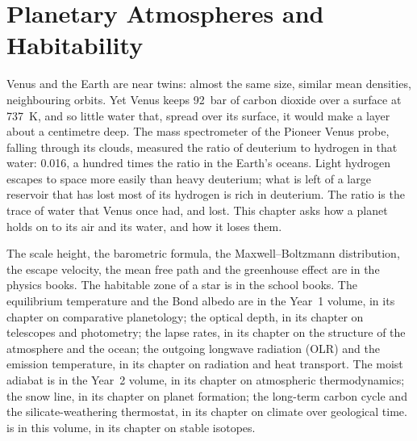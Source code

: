 \chapter{Planetary Atmospheres and Habitability}\label{ch:b3:planetary-atmospheres}

Venus and the Earth are near twins: almost the same size, similar mean
densities, neighbouring orbits. Yet Venus keeps \qty{92}{bar} of carbon
dioxide over a surface at \qty{737}{K}, and so little water that, spread
over its surface, it would make a layer about a centimetre deep. The mass
spectrometer of the Pioneer Venus probe, falling through its clouds,
measured the ratio of deuterium to hydrogen in that water: \num{0.016},
a hundred times the ratio in the Earth's oceans. Light hydrogen escapes to
space more easily than heavy deuterium; what is left of a large reservoir
that has lost most of its hydrogen is rich in deuterium. The ratio is the
trace of water that Venus once had, and lost. This chapter asks how a
planet holds on to its air and its water, and how it loses them.

\begin{recall}
The scale height, the barometric formula, the Maxwell--Boltzmann
distribution, the escape velocity, the mean free path and the greenhouse
effect are in the physics books. The habitable zone of a star is in the
school books. The equilibrium temperature and the Bond albedo are in the
Year~1 volume, in its chapter on comparative planetology; the optical
depth, in its chapter on telescopes and photometry; the lapse rates, in
its chapter on the structure of the atmosphere and the ocean; the outgoing
longwave radiation (OLR) and the emission temperature, in its chapter on
radiation and heat transport. The moist adiabat is in the Year~2 volume,
in its chapter on atmospheric thermodynamics; the snow line, in its
chapter on planet formation; the long-term carbon cycle and the
silicate-weathering thermostat, in its chapter on climate over geological
time.  is in this volume, in its chapter on stable
isotopes.
\end{recall}

